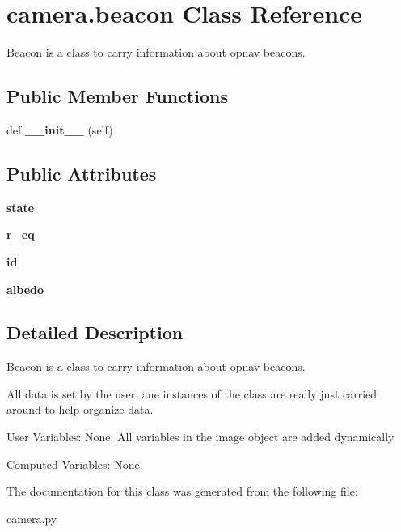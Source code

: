 \hypertarget{classcamera_1_1beacon}{}\section{camera.\+beacon Class Reference}
\label{classcamera_1_1beacon}


Beacon is a class to carry information about opnav beacons.  


\subsection*{Public Member Functions}
\begin{DoxyCompactItemize}
\item 
\mbox{\label{classcamera_1_1beacon_a70a044188f7733367863fd59f5ffa0c6}} 
def {\bfseries \+\_\+\+\_\+init\+\_\+\+\_\+} (self)
\end{DoxyCompactItemize}
\subsection*{Public Attributes}
\begin{DoxyCompactItemize}
\item 
\mbox{\label{classcamera_1_1beacon_ad4c2dbec8e5599d9a36f79c651a8f69c}} 
{\bfseries state}
\item 
\mbox{\label{classcamera_1_1beacon_a2569dde19f816746e72c9a899e260c81}} 
{\bfseries r\+\_\+eq}
\item 
\mbox{\label{classcamera_1_1beacon_ac2536b57c4bc0fd06648a08e8c4096b9}} 
{\bfseries id}
\item 
\mbox{\label{classcamera_1_1beacon_aa1ff0be3047c5fe5581701e44d87087e}} 
{\bfseries albedo}
\end{DoxyCompactItemize}


\subsection{Detailed Description}
Beacon is a class to carry information about opnav beacons. 

All data is set by the user, ane instances of the class are really just carried around to help organize data.

User Variables\+: None. All variables in the image object are added dynamically

Computed Variables\+: None. 

The documentation for this class was generated from the following file\+:\begin{DoxyCompactItemize}
\item 
camera.\+py\end{DoxyCompactItemize}
